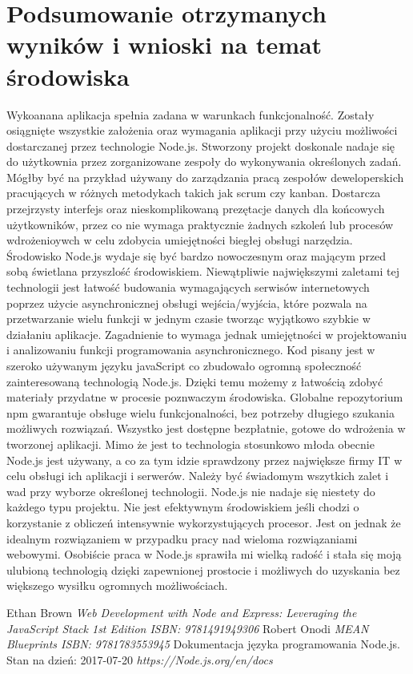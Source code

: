 \documentclass[12pt]{report}
\begin{document}
\chapter{Podsumowanie otrzymanych wyników i wnioski na temat środowiska}
Wykoanana aplikacja spełnia zadana w warunkach funkcjonalność. 
Zostały osiągnięte wszystkie założenia oraz wymagania aplikacji przy użyciu możliwości dostarczanej przez technologie Node.js. 
Stworzony projekt doskonale nadaje się do użytkownia przez zorganizowane zespoły do wykonywania określonych zadań. 
Mógłby być na przykład używany do zarządzania pracą zespołów deweloperskich pracujących w różnych metodykach takich jak scrum czy kanban. 
Dostarcza przejrzysty interfejs oraz nieskomplikowaną prezętacje danych dla końcowych użytkowników, przez co nie wymaga praktycznie żadnych szkoleń lub procesów wdrożenioywch w celu zdobycia umiejętności biegłej obsługi narzędzia. 
Środowisko Node.js wydaje się być bardzo nowoczesnym oraz mającym przed sobą świetlana przyszlość środowiskiem. 
Niewątpliwie największymi zaletami tej technologii jest łatwość budowania wymagających serwisów internetowych poprzez użycie asynchronicznej obsługi wejścia/wyjścia, które pozwala na przetwarzanie wielu funkcji w jednym czasie tworząc wyjątkowo szybkie w działaniu aplikacje. 
Zagadnienie to wymaga jednak umiejętności w projektowaniu i analizowaniu funkcji programowania asynchronicznego. 
Kod pisany jest w szeroko używanym języku javaScript co zbudowało ogromną społeczność zainteresowaną technologią Node.js. 
Dzięki temu możemy z łatwością zdobyć materiały przydatne w procesie poznwaczym środowiska. 
Globalne repozytorium npm gwarantuje obsługe wielu funkcjonalności, bez potrzeby długiego szukania możliwych rozwiązań. 
Wszystko jest dostępne bezpłatnie, gotowe do wdrożenia w tworzonej aplikacji. 
Mimo że jest to technologia stosunkowo młoda obecnie Node.js jest używany, a co za tym idzie sprawdzony przez największe firmy IT w celu obsługi ich aplikacji i serwerów. 
Należy być świadomym wszytkich zalet i wad przy wyborze określonej technologii. 
Node.js nie nadaje się niestety do każdego typu projektu. 
Nie jest efektywnym środowiskiem jeśli chodzi o korzystanie z obliczeń intensywnie wykorzystujących procesor. 
Jest on jednak że idealnym rozwiązaniem w przypadku pracy nad wieloma rozwiązaniami webowymi. 
Osobiście praca w Node.js sprawiła mi wielką radość i stała się moją ulubioną technologią dzięki zapewnionej prostocie i możliwych do uzyskania bez większego wysiłku ogromnych możliwościach.

\begin{thebibliography}{99}
Ethan Brown
\textit{Web Development with Node and Express: Leveraging the JavaScript Stack 1st Edition ISBN: 9781491949306}
Robert Onodi
\textit{MEAN Blueprints ISBN: 9781783553945}
Dokumentacja języka programowania Node.js. Stan na dzień: 2017-07-20
\textit{https://Node.js.org/en/docs}

\end{thebibliography}

\listoffigures
\end{document}
